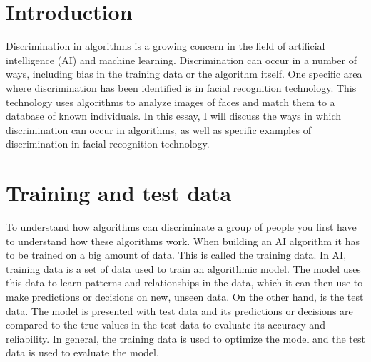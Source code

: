 \documentclass[
	12pt,
    a4paper,
    egregdoesnotlikesansseriftitles, %
    toc=chapterentrywithdots,
    oneside, openany,
    titlepage,
    parskip=half,
    headings=normal,  %
    listof=totoc,
    bibliography=totocnumbered,
    index=totoc,
    captions=tableheading,  %
    listof=flat,
    numbers=noenddot, %
    final]
    {scrbook}
\begin{document}
\setcounter{secnumdepth}{3}  %
\setcounter{tocdepth}{2}  %


\frontmatter


\tableofcontents

\listoffigures
\clearpage %

\listoftables
\clearpage %

\renewcommand{\lstlistlistingname}{List of Listings}  %
\clearpage %

\mainmatter

\chapter{Introduction}
Discrimination in algorithms is a growing concern in the field of artificial intelligence (AI) and machine learning. 
Discrimination can occur in a number of ways, including bias in the training data or the algorithm itself. 
One specific area where discrimination has been identified is in facial recognition technology. This technology uses algorithms to analyze images of faces and match them to a database of known individuals.
In this essay, I will discuss the ways in which discrimination can occur in algorithms, as well as specific examples of discrimination in facial recognition technology.

\chapter{Training and test data}
To understand how algorithms can discriminate a group of people you first have to understand how these algorithms work. 
When building an AI algorithm it has to be trained on a big amount of data. 
This is called the training data. In AI, training data is a set of data used to train an algorithmic model. 
The model uses this data to learn patterns and relationships in the data, which it can then use to make predictions or decisions on new, unseen data. 
On the other hand, is the test data. The model is presented with test data and its predictions or decisions are compared to the true values in the test data to evaluate its accuracy and reliability. 
In general, the training data is used to optimize the model and the test data is used to evaluate the model. \cite[p. 32-33]{khan_guide_2018}
\end{document}
